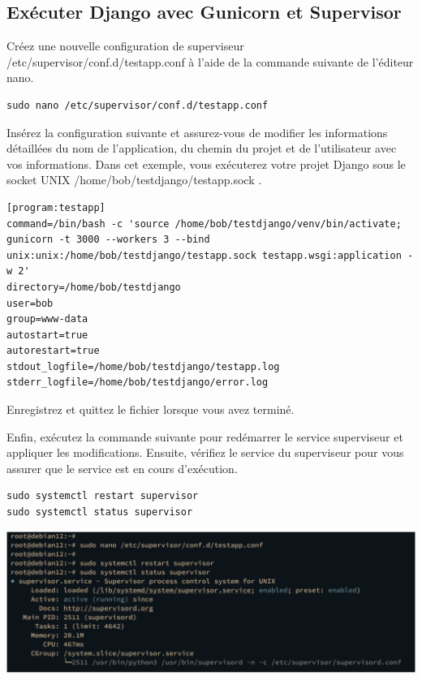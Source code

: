 \documentclass{article}
\begin{document}
\subsection{Exécuter Django avec Gunicorn et Supervisor}
Créez une nouvelle configuration de superviseur /etc/supervisor/conf.d/testapp.conf à l'aide de la commande suivante de l'éditeur nano.

\begin{verbatim}
sudo nano /etc/supervisor/conf.d/testapp.conf
\end{verbatim}

Insérez la configuration suivante et assurez-vous de modifier les informations détaillées du nom de l'application, du chemin du projet et de l'utilisateur avec vos informations. Dans cet exemple, vous exécuterez votre projet Django sous le socket UNIX /home/bob/testdjango/testapp.sock .

\begin{verbatim}
[program:testapp] 
command=/bin/bash -c 'source /home/bob/testdjango/venv/bin/activate; gunicorn -t 3000 --workers 3 --bind unix:unix:/home/bob/testdjango/testapp.sock testapp.wsgi:application -w 2'
directory=/home/bob/testdjango
user=bob
group=www-data
autostart=true 
autorestart=true 
stdout_logfile=/home/bob/testdjango/testapp.log 
stderr_logfile=/home/bob/testdjango/error.log
\end{verbatim}

Enregistrez et quittez le fichier lorsque vous avez terminé.


Enfin, exécutez la commande suivante pour redémarrer le service superviseur et appliquer les modifications. Ensuite, vérifiez le service du superviseur pour vous assurer que le service est en cours d'exécution.

\begin{verbatim}
sudo systemctl restart supervisor
sudo systemctl status supervisor
\end{verbatim}

\begin{center}
\includegraphics[width=15cm]{images/image21.png}
\end{center}
\end{document}
